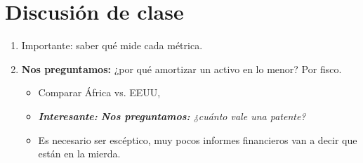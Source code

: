 \section{Discusión de clase}
\begin{enumerate}
    \item Importante: saber qué mide cada métrica.
    \item \textbf{Nos preguntamos:} ¿por qué amortizar un activo en lo menor? Por fisco.
        \begin{itemize}
            \item Comparar África vs. EEUU, 
            \item \emph{\textbf{Interesante:} \textbf{Nos preguntamos:} ¿cuánto vale una patente?}
            \item Es necesario ser escéptico, muy pocos informes financieros van a decir que están en la mierda. 
        \end{itemize}
\end{enumerate}

